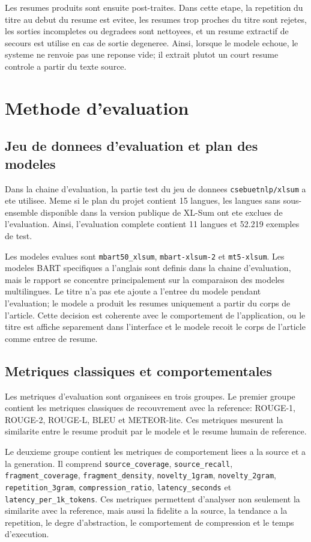 Les resumes produits sont ensuite post-traites. Dans cette etape, la repetition du titre au debut du resume est evitee, les resumes trop proches du titre sont rejetes, les sorties incompletes ou degradees sont nettoyees, et un resume extractif de secours est utilise en cas de sortie degeneree. Ainsi, lorsque le modele echoue, le systeme ne renvoie pas une reponse vide; il extrait plutot un court resume controle a partir du texte source.

\section{Methode d'evaluation}

\subsection{Jeu de donnees d'evaluation et plan des modeles}

Dans la chaine d'evaluation, la partie test du jeu de donnees \texttt{csebuetnlp/xlsum} a ete utilisee. Meme si le plan du projet contient 15 langues, les langues sans sous-ensemble disponible dans la version publique de XL-Sum ont ete exclues de l'evaluation. Ainsi, l'evaluation complete contient 11 langues et 52.219 exemples de test.

Les modeles evalues sont \texttt{mbart50\_xlsum}, \texttt{mbart-xlsum-2} et \texttt{mt5-xlsum}. Les modeles BART specifiques a l'anglais sont definis dans la chaine d'evaluation, mais le rapport se concentre principalement sur la comparaison des modeles multilingues. Le titre n'a pas ete ajoute a l'entree du modele pendant l'evaluation; le modele a produit les resumes uniquement a partir du corps de l'article. Cette decision est coherente avec le comportement de l'application, ou le titre est affiche separement dans l'interface et le modele recoit le corps de l'article comme entree de resume.

\subsection{Metriques classiques et comportementales}

Les metriques d'evaluation sont organisees en trois groupes. Le premier groupe contient les metriques classiques de recouvrement avec la reference: ROUGE-1, ROUGE-2, ROUGE-L, BLEU et METEOR-lite. Ces metriques mesurent la similarite entre le resume produit par le modele et le resume humain de reference.

Le deuxieme groupe contient les metriques de comportement liees a la source et a la generation. Il comprend \texttt{source\_coverage}, \texttt{source\_recall}, \texttt{fragment\_coverage}, \texttt{fragment\_density}, \texttt{novelty\_1gram}, \texttt{novelty\_2gram}, \texttt{repetition\_3gram}, \texttt{compression\_ratio}, \texttt{latency\_seconds} et \texttt{latency\_per\_1k\_tokens}. Ces metriques permettent d'analyser non seulement la similarite avec la reference, mais aussi la fidelite a la source, la tendance a la repetition, le degre d'abstraction, le comportement de compression et le temps d'execution.

